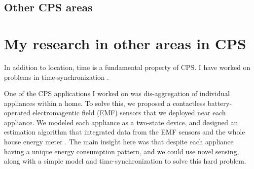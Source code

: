 \documentclass[10pt]{article}
\begin{document}
\subsection{Other CPS areas}

\section{My research in other areas in CPS}
In addition to location, time is a fundamental property of CPS. I have worked on problems in time-synchronization \cite{buevich2013hardware, dongare2017pulsar, rtas-alps-platform}.  %
 
One of the CPS applications I worked on was dis-aggregation of individual appliances within a home. 
To solve this, we proposed a contactless battery-operated electromagentic field (EMF) sensors that we deployed near each appliance. We modeled each appliance as a two-state device, and designed an estimation algorithm that integrated data from the EMF sensors and the whole house energy meter \cite{rajagopal2013magnetic, rajagopal2013demo}. The main insight here was that despite each appliance having a unique energy consumption pattern, and we could use novel sensing, along with a simple model and time-synchronization to solve this hard problem. %
\end{document}
